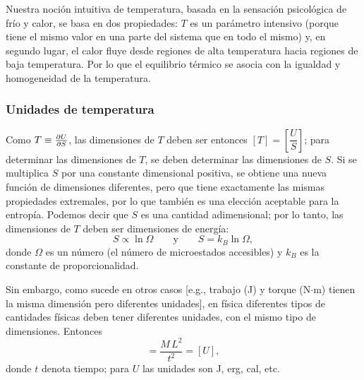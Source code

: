 Nuestra noción intuitiva de temperatura, basada en la sensación psicológica de frío y calor, se
basa en dos propiedades: $T$ es un parámetro intensivo (porque tiene el mismo valor en una parte
del sistema que en todo el mismo) y, en segundo lugar, el calor fluye desde regiones de alta
temperatura hacia regiones de baja temperatura. Por lo que el equilibrio térmico se asocia con la
igualdad y homogeneidad de la temperatura.

\subsubsection*{Unidades de temperatura}

Como $T\equiv\pdv{U}{S}$, las dimensiones de $T$ deben ser entonces $[T]=\left[\dfrac{U}{S}\right]$;
para determinar las dimensiones de $T$, se deben determinar las dimensiones de $S$. Si se multiplica
$S$ por una constante dimensional positiva, se obtiene una nueva función de dimensiones diferentes,
pero que tiene exactamente las mismas propiedades extremales, por lo que también es una elección
aceptable para la entropía. Podemos decir que $S$ es una cantidad adimensional; por lo tanto, las
dimensiones de $T$ deben ser dimensiones de energía:
\begin{equation*}
  S\propto\ln\Omega\qquad\text{y}\qquad S=k_B\ln\Omega,
\end{equation*}
donde $\Omega$ es un número (el número de microestados accesibles) y $k_B$ es la constante de
proporcionalidad.

Sin embargo, como sucede en otros casos [e.g., trabajo (J) y torque (N$\cdot$m) tienen la misma
dimensión pero diferentes unidades], en física diferentes tipos de cantidades físicas deben tener
diferentes unidades, con el mismo tipo de dimensiones. Entonces
\begin{equation*}
  [T]=\frac{M\,L^{2}}{t^{2}}=[U],
\end{equation*}
donde $t$ denota tiempo; para $U$ las unidades son J, erg, cal, etc.

